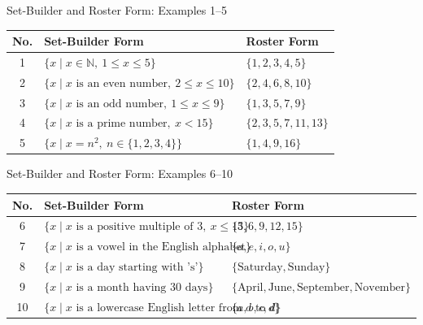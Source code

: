 \documentclass[aspectratio=169]{beamer}
\begin{document}
\begin{frame}{Set-Builder and Roster Form: Examples 1--5}
\scriptsize
\begin{center}
\begin{tabular}{|c|p{5.3cm}|p{5.3cm}|}
\hline
\textbf{No.} & \textbf{Set-Builder Form} & \textbf{Roster Form}\\
\hline
1 &
$\{x\mid x\in\mathbb{N},\ 1\leq x\leq5\}$ &
$\{1,2,3,4,5\}$\\
\hline
2 &
$\{x\mid x\text{ is an even number},\ 2\leq x\leq10\}$ &
$\{2,4,6,8,10\}$\\
\hline
3 &
$\{x\mid x\text{ is an odd number},\ 1\leq x\leq9\}$ &
$\{1,3,5,7,9\}$\\
\hline
4 &
$\{x\mid x\text{ is a prime number},\ x<15\}$ &
$\{2,3,5,7,11,13\}$\\
\hline
5 &
$\{x\mid x=n^2,\ n\in\{1,2,3,4\}\}$ &
$\{1,4,9,16\}$\\
\hline
\end{tabular}
\end{center}
\end{frame}

\begin{frame}{Set-Builder and Roster Form: Examples 6--10}
\scriptsize
\begin{center}
\begin{tabular}{|c|p{5.3cm}|p{5.3cm}|}
\hline
\textbf{No.} & \textbf{Set-Builder Form} & \textbf{Roster Form}\\
\hline
6 &
$\{x\mid x\text{ is a positive multiple of }3,\ x\leq15\}$ &
$\{3,6,9,12,15\}$\\
\hline
7 &
$\{x\mid x\text{ is a vowel in the English alphabet}\}$ &
$\{a,e,i,o,u\}$\\
\hline
8 &
$\{x\mid x\text{ is a day starting with 's'}\}$ &
$\{\text{Saturday},\text{Sunday}\}$\\
\hline
9 &
$\{x\mid x\text{ is a month having }30\text{ days}\}$ &
$\{\text{April},\text{June},\text{September},\text{November}\}$\\
\hline
10 &
$\{x\mid x\text{ is a lowercase English letter from }a\text{ to }d\}$ &
$\{a,b,c,d\}$\\
\hline
\end{tabular}
\end{center}
\end{frame}
\end{document}
